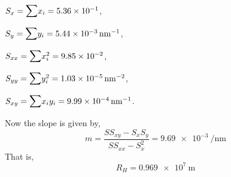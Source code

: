 \documentclass[%
 reprint,
 amsmath,amssymb,
 aps,
]{revtex4-2}
\begin{document}
    \par
    \vspace{0.5cm}
    $S_{x} = \mathlarger{\mathlarger{\sum}} x_{i} = 5.36 \times 10^{-1}$,
    \par
    \vspace{0.5cm}
    $S_{y} = \mathlarger{\mathlarger{\sum}} y_{i} = \SI{5.44e-3}{\per \nano \metre}$,
    \par
    \vspace{0.5cm}
    $S_{xx} = \mathlarger{\mathlarger{\sum}} x_{i}^2 = 9.85 \times 10^{-2}$,
    \par
    \vspace{0.5cm}
    $S_{yy} = \mathlarger{\mathlarger{\sum}} y_{i}^2 = \SI{1.03e-5}{\per \nano \metre \squared}$,
    \par
    \vspace{0.5cm}
    $S_{xy} = \mathlarger{\mathlarger{\sum}} x_{i}y_{i} = \SI{9.99e-4}{\per \nano \metre}$.
    \par
    \vspace{0.5cm}
    Now the slope is given by,
        \begin{equation}
        \label{eq11}
            m = \dfrac{S S_{xy} - S_{x}S_{y}}{S S_{xx} - S_{x}^2} = \SI{9.69e-3}{\per \nano \metre}
        \end{equation}
    That is, 
    \begin{equation}
        \boxed{R_H = \SI{0.969e7}{\metre}}
    \end{equation}
    
    
\end{document}
